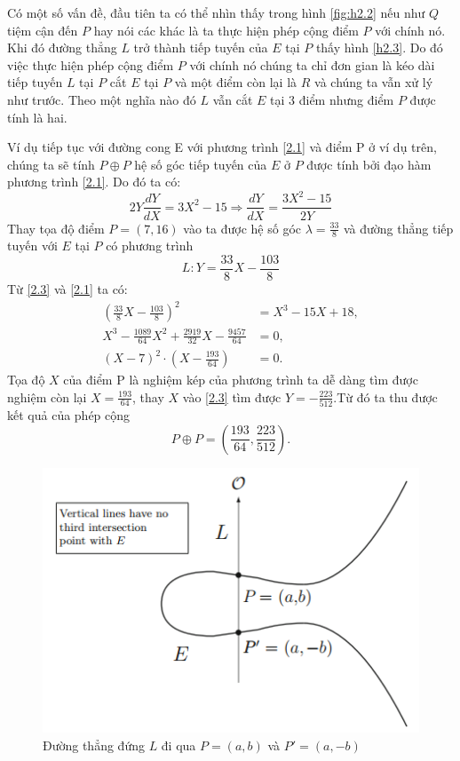\documentclass[a4paper,12pt]{report}
\newcounter{someCounter}
\begin{document}
Có một số vấn đề, đầu tiên ta có thể nhìn thấy trong hình \ref{fig:h2.2} nếu như $Q$ tiệm cận đến $P$ hay nói các khác là ta thực hiện phép cộng điểm $P$ với chính nó. Khi đó đường thẳng $L$ trở thành tiếp tuyến của $E$ tại $P$ thấy hình \ref{h2.3}. Do đó việc thực hiện phép cộng điểm $P$ với chính nó chúng ta chỉ đơn gian là kéo dài tiếp tuyến $L$ tại $P$ cắt $E$ tại $P$ và một điểm còn lại là $R$ và chúng ta vẫn xử lý như trước. Theo một nghĩa nào đó $L$ vẫn cắt $E$ tại 3 điểm nhưng điểm $P$ được tính là hai.

Ví dụ tiếp tục với đường cong E với phương trình \ref{2.1} và điểm P ở ví dụ trên, chúng ta sẽ tính $P \oplus P$ hệ số góc tiếp tuyến của $E$ ở $P$ được tính bởi đạo hàm phương trình \ref{2.1}. Do đó ta có:
\begin{displaymath}
2Y\frac{dY}{dX} = 3X^2 - 15 \Rightarrow \frac{dY}{dX} = \frac{3X^2 - 15}{2Y}
\end{displaymath}
Thay tọa độ điểm $P = (7,16)$ vào ta được hệ số góc $\displaystyle \lambda = \frac{33}{8}$ và đường thẳng tiếp tuyến với $E$ tại $P$ có phương trình
\begin{equation}
L: Y = \frac{33}{8}X - \frac{103}{8} \label{2.3}
\end{equation}
Từ \ref{2.3} và \ref{2.1} ta có:
\begin{displaymath}
\begin{aligned}
(\frac{33}{8}X - \frac{103}{8})^2 & = X^3 - 15X + 18, \\
X^3 - \frac{1089}{64}X^2 + \frac{2919}{32}X - \frac{9457}{64} & = 0, \\
(X - 7)^2\cdot(X - \frac{193}{64}) & = 0.
\end{aligned}
\end{displaymath}
Tọa độ $X$ của điểm P là nghiệm kép của phương trình ta dễ dàng tìm được nghiệm còn lại $\displaystyle X = \frac{193}{64}$, thay $X$ vào \ref{2.3} tìm được $\displaystyle Y = -\frac{223}{512}$.Từ đó ta thu được kết quả của phép cộng
\begin{displaymath}
P \oplus P = (\frac{193}{64}, \frac{223}{512}).
\end{displaymath}

\begin{figure}[h]
\begin{center}
\includegraphics[scale=1]{../im4.png}
\caption{Đường thẳng đứng $L$ đi qua $P = (a, b)$ và $P' = (a, -b)$}
\label{h2.4}
\end{center}
\end{figure}
\end{document}

